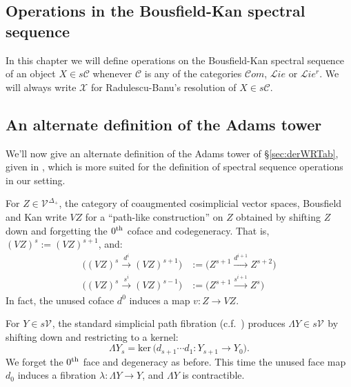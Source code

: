 \documentclass[11pt]{amsart} \renewcommand{\baselinestretch}{1.2}
\theoremstyle{plain}
\theoremstyle{definition}
\renewcommand{\ker}{\mathrm{ker}\,}
\renewcommand{\to}{\longrightarrow}
\newcommand{\scrL}{\mathscr{L}}
\newcommand{\scrC}{\mathscr{C}}
\newcommand{\calV}{\mathcal{V}}
\newcommand{\calw}{\mathcal{W}}
\newcommand{\calx}{\mathcal{X}}
\newcommand{\calc}{\mathcal{C}}
\newcommand{\citeBOX}[2][]{\cite[\mbox{#1}]{#2}}
\newcommand{\vect}[2]{\calV^{#1}_{#2}}
\newcommand{\HA}[1]{H#1}
\newcommand{\algs}{{\scrC\!\textit{om}}}
\newcommand{\liealgs}{{\scrL\!\textit{ie}}}
\newcommand{\restliealgs}{{\scrL\!\textit{ie}^\textit{r}}}
\newcommand{\algcat}{{\calc}}%
\begin{document}
\begin{Operations on the Bousfield-Kan spectral sequence}
\section{\textbf{Operations in the Bousfield-Kan spectral sequence}}
\label{Operations on the Bousfield-Kan spectral sequence}
In this chapter
we will define operations on the Bousfield-Kan spectral sequence of an object $X\in s\calc$ whenever $\calc$ is any of the categories $\algs$, $\liealgs$ or $\restliealgs$. We will always write $\calx$ for Radulescu-Banu's resolution of $X\in s\algcat$. %


\subsection{An alternate definition of the Adams tower}
\label{An alternate definition of the Adams tower}
We'll now give an alternate definition of the Adams tower of \S\ref{sec:derWRTab}, given in \cite{BK_pairings_products.pdf}, which is more suited for the definition of spectral sequence operations in our setting.

For $Z\in {\vect{}{}}^{\Delta_+}$, the category of coaugmented cosimplicial vector spaces, Bousfield and Kan write $VZ$ for a ``path-like construction'' \citeBOX[\S3.1]{BK_pairings_products.pdf} on $Z$ obtained by shifting $Z$ down and forgetting the $0^\textup{th}$ coface and codegeneracy. That is, $(VZ)^s:=(VZ)^{s+1}$, and:
\begin{align*}
\bigl((VZ)^s\overset{d^i}{\to} (VZ)^{s+1}\bigr)&:=\bigl(Z^{s+1}\overset{d^{i+1}}{\to} Z^{s+2}\bigr)\\
\bigl((VZ)^s\overset{s^i}{\to} (VZ)^{s-1}\bigr)&:=\bigl(Z^{s+1}\overset{s^{i+1}}{\to} Z^{s}\bigr)
\end{align*}
In fact, the unused coface $d^0$ induces a map $v:Z\to VZ$.

For $Y\in s\vect{}{}$, the standard simplicial path fibration (c.f.\ \citeBOX[p.~82]{BousKanSSeq.pdf}) produces $\Lambda Y\in s\vect{}{}$ by shifting down and restricting to a kernel:
\[\Lambda Y_s=\ker\bigl(d_{s+1}\cdots d_1:Y_{s+1}\to Y_0\bigr).\]
We forget the $0^\textup{th}$ face and degeneracy as before. This time the unused face map $d_0$ induces a fibration $\lambda:\Lambda Y\to Y$, and $\Lambda Y$ is  contractible.



\end{Operations on the Bousfield-Kan spectral sequence}
\end{document}
